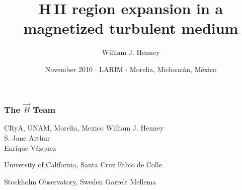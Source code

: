 \documentclass{beamer}
\title{H\,II region expansion in a magnetized turbulent medium}
\author
{
  William J. Henney
}                               %
\institute[CRyA, UNAM]
{
  \structure{Centro de Radioastronomía y Astrofísica\\
  UNAM, Morelia, México}
}
\date{November 2010 \(\cdot\) LARIM \(\cdot\) Morelia, Michoacán, México}
\begin{document}
\begin{frame}
  \titlepage
\end{frame}

\newlength\photowidth
\setlength\photowidth{1.2cm}
\begin{frame}
  \frametitle{The \boldmath\(\vec{B}\) Team}
  \begin{block}{CRyA, UNAM, Morelia, Mexico}
    William J. Henney\hfill {}\hspace*{2\photowidth}~\\
    \smallskip
    \quad S. Jane Arthur\hfill {}\hspace*{\photowidth}~\\
    \smallskip
    \quad\quad Enrique Vázquez\hfill {}\\
  \end{block}

  \begin{block}{University of California, Santa Cruz}
    Fabio de Colle\hfill {}
  \end{block}
  \begin{block}{Stockholm Observatory, Sweden}
    Garrelt Mellema\hfill {}\hspace*{\photowidth}~
  \end{block}

\end{frame}
\end{document}
